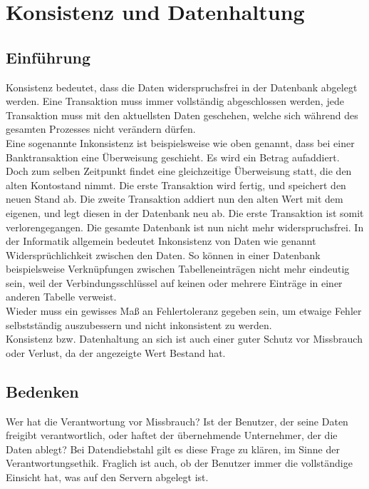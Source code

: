 \documentclass[letterpaper, 12pt]{article}
\let\tempsection\section
\renewcommand\section[1]{\vspace{-0.3cm}\tempsection{#1}\vspace{-0.3cm}}
\let\tempsubsection\subsection
\renewcommand\subsection[1]{\vspace{0cm}\tempsubsection{#1}\vspace{0cm}}
\begin{document}
\clearpage

\section{Konsistenz und Datenhaltung}

\subsection{Einführung}

Konsistenz bedeutet, dass die Daten widerspruchsfrei in der Datenbank abgelegt werden. Eine Transaktion muss immer vollständig abgeschlossen werden, jede Transaktion muss mit den aktuellsten Daten geschehen, welche sich während des gesamten Prozesses nicht verändern dürfen. \\
Eine sogenannte Inkonsistenz ist beispielsweise wie oben genannt, dass bei einer Banktransaktion eine Überweisung geschieht. Es wird ein Betrag aufaddiert. Doch zum selben Zeitpunkt findet eine gleichzeitige Überweisung statt, die den alten Kontostand nimmt. Die erste Transaktion wird fertig, und speichert den neuen Stand ab. Die zweite Transaktion addiert nun den alten Wert mit dem eigenen, und legt diesen in der Datenbank neu ab. Die erste Transaktion ist somit verlorengegangen. Die gesamte Datenbank ist nun nicht mehr widerspruchsfrei. In der Informatik allgemein bedeutet Inkonsistenz von Daten wie genannt Widersprüchlichkeit zwischen den Daten. So können in einer Datenbank beispielsweise Verknüpfungen zwischen Tabelleneinträgen nicht mehr eindeutig sein, weil der Verbindungsschlüssel auf keinen oder mehrere Einträge in einer anderen Tabelle verweist. \\
Wieder muss ein gewisses Maß an Fehlertoleranz gegeben sein, um etwaige Fehler selbstständig auszubessern und nicht inkonsistent zu werden. \\
Konsistenz bzw. Datenhaltung an sich ist auch einer guter Schutz vor Missbrauch oder Verlust, da der angezeigte Wert Bestand hat. \cite{dezsys}

\subsection{Bedenken}

Wer hat die Verantwortung vor Missbrauch? Ist der Benutzer, der seine Daten freigibt verantwortlich, oder haftet der übernehmende Unternehmer, der die Daten ablegt? Bei Datendiebstahl gilt es diese Frage zu klären, im Sinne der Verantwortungsethik. Fraglich ist auch, ob der Benutzer immer die vollständige Einsicht hat, was auf den Servern abgelegt ist.
\end{document}
